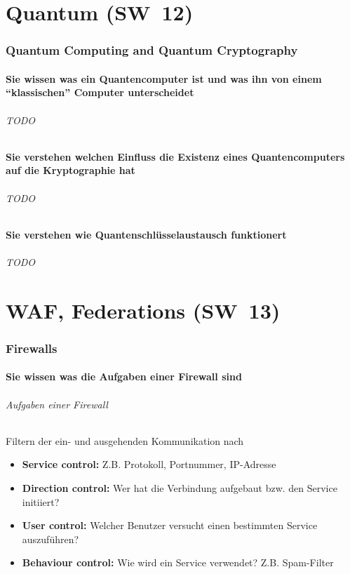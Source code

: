 \documentclass[10pt,a4paper]{article}
\begin{document}
\part{Quantum (SW~12)}
\section{Quantum Computing and Quantum Cryptography}
\subsection*{Sie wissen was ein Quantencomputer ist und was ihn von einem "`klassischen"' Computer unterscheidet}
\paragraph*{TODO}

\subsection*{Sie verstehen welchen Einfluss die Existenz eines Quantencomputers auf die Kryptographie hat}
\paragraph*{TODO}

\subsection*{Sie verstehen wie Quantenschlüsselaustausch funktionert}
\paragraph*{TODO}


\part{WAF, Federations (SW~13)}
\section{Firewalls}
\subsection*{Sie wissen was die Aufgaben einer Firewall sind}
\paragraph*{Aufgaben einer Firewall}Filtern der ein- und ausgehenden Kommunikation nach
\begin{itemize}[noitemsep,topsep=0pt,leftmargin=*]
    \item \textbf{Service control:} Z.B. Protokoll, Portnummer, IP-Adresse
    \item \textbf{Direction control:} Wer hat die Verbindung aufgebaut bzw. den Service initiiert?
    \item \textbf{User control:} Welcher Benutzer versucht einen bestimmten Service auszuführen?
    \item \textbf{Behaviour control:} Wie wird ein Service verwendet? Z.B. Spam-Filter
\end{itemize}
\end{document}
